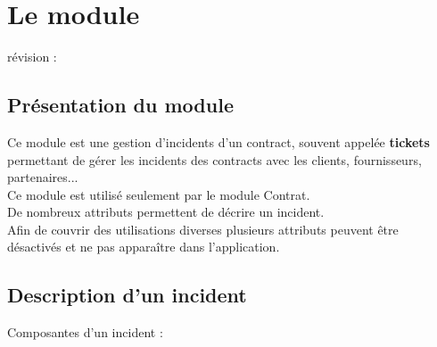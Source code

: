 
\clearpage
\section{Le module \incident}

révision : 

\subsection{Présentation du module \incident}

Ce module est une gestion d'incidents d'un contract, souvent appelée \textbf{tickets} permettant de gérer les incidents des contracts avec les clients, fournisseurs, partenaires...\\

Ce module \incident est utilisé seulement par le module Contrat.\\

De nombreux attributs permettent de décrire un incident.\\
Afin de couvrir des utilisations diverses plusieurs attributs peuvent être désactivés et ne pas apparaître dans l'application.\\

\subsection{Description d'un incident}

Composantes d'un incident :\\

